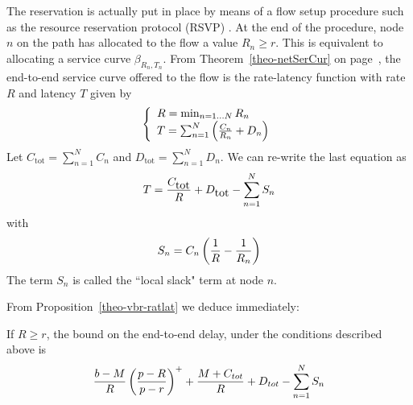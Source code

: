 The reservation is actually put in place by means of a flow setup
procedure such as the resource reservation protocol (RSVP)%
. At the end of the procedure, node $n$ on the path
has allocated to the flow a value $ R_{n}\geq r$. This is
equivalent to allocating a service curve $\beta_{R_n,T_n}$. From
Theorem~\ref{theo-netSerCur} on page~\pageref{theo-netSerCur}, the
end-to-end service curve offered to the flow is the rate-latency
function with rate $R$ and latency $T$ given by
$$
\left\{\begin{array}{l} 
 R = \min_{n=1...N}R_{n} \\
 T = \sum_{n=1}^N \left(\frac{C_n}{R_n} + D_n\right)
  \end{array} \right.
$$
 Let
$C_{\mbox{tot}}=\sum_{n=1}^{N} C_n$ and
$D_{\mbox{tot}}=\sum_{n=1}^{N} D_n$. We can re-write the last
equation as
\begin{equation}\mylabel{eq-rtlcnete1}
 T = \frac{C_{\mbox{tot}}}{R} + D_{\mbox{tot}} -
 \sum_{n=1}^N S_n
\end{equation}
with
\begin{equation}\mylabel{eq-rtlcnete2}
 S_n =C_n \left(\frac{1}{R}- \frac{1}{R_n}\right)
\end{equation}
The term $S_n$ is called the ``local slack" term at node $n$.


From Proposition~\ref{theo-vbr-ratlat} we deduce immediately:
\begin{proposition}
    If $R \geq r$, the bound on the end-to-end delay,
    under the conditions described above is
    \begin{equation}
        \frac{b-M}{R} \left(
                  \frac{p-R}{p-r}
                  \right)^{+}
    + \frac{M + C_{tot}}{R}  +  D_{tot}  - \sum_{n=1}^N S_n
        \mylabel{eq-tot-del-1}
    \end{equation}
\end{proposition}

